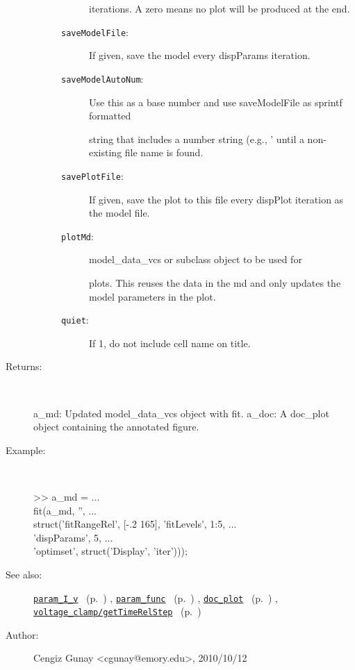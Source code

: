 \begin{description}
\begin{description}
\begin{description}
iterations. A zero means no plot will be produced at the
end.
\item[\texttt{saveModelFile}:]
 If given, save the model every dispParams iteration.
\item[\texttt{saveModelAutoNum}:]
 Use this as a base number and use saveModelFile as sprintf formatted

string that includes a number string (e.g., '%
until a non-existing file name is found.
\item[\texttt{savePlotFile}:]
 If given, save the plot to this file every dispPlot iteration as the model file.
\item[\texttt{plotMd}:]
 model\_data\_vcs or subclass object to be used for

plots. This reuses the data in the md and only updates the model
parameters in the plot.
\item[\texttt{quiet}:]
 If 1, do not include cell name on title.
\end{description}%
\end{description}%
%
\item[Returns:
]~

   a\_md: Updated model\_data\_vcs object with fit.
   a\_doc: A doc\_plot object containing the annotated figure.
%
\item[Example:]~
\begin{lyxcode} >> a\_md = ...
\\%
    fit(a\_md, '', ...
\\%
      struct('fitRangeRel', [-.2 165], 'fitLevels', 1:5, ...
\\%
             'dispParams', 5, ...
\\%
             'optimset', struct('Display', 'iter')));
\\%
\end{lyxcode}
%
\item[See also:]%
\hyperlink{ref_param_I_v}{\texttt{param\_I\_v}}%
\ (p.~\pageref{ref_param_I_v})%
%
, \hyperlink{ref_param_func}{\texttt{param\_func}}%
\ (p.~\pageref{ref_param_func})%
%
, \hyperlink{ref_doc_plot}{\texttt{doc\_plot}}%
\ (p.~\pageref{ref_doc_plot})%
%
, \hyperlink{ref_voltage_clamp__getTimeRelStep}{\texttt{voltage\_clamp/getTimeRelStep}}%
\ (p.~\pageref{ref_voltage_clamp__getTimeRelStep})%
%
%
\item[Author:]%
Cengiz Gunay <cgunay@emory.edu>, 2010/10/12
%
\end{description}
\methodline%
